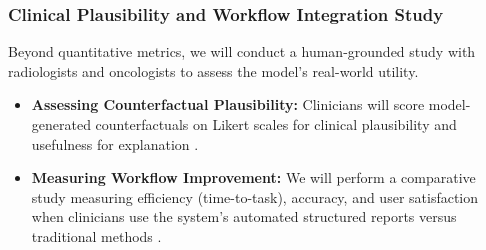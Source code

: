 \documentclass[11pt, a4paper]{article}
\begin{document}
\subsubsection{Clinical Plausibility and Workflow Integration Study}
Beyond quantitative metrics, we will conduct a human-grounded study with radiologists and oncologists to assess the model's real-world utility.
\begin{itemize}
    \item \textbf{Assessing Counterfactual Plausibility:} Clinicians will score model-generated counterfactuals on Likert scales for clinical plausibility and usefulness for explanation \cite{GuoDeng2024, RossiLopez2024}.
    \item \textbf{Measuring Workflow Improvement:} We will perform a comparative study measuring efficiency (time-to-task), accuracy, and user satisfaction when clinicians use the system's automated structured reports versus traditional methods \cite{UnknownAuthor2020}.
\end{itemize}
\end{document}
